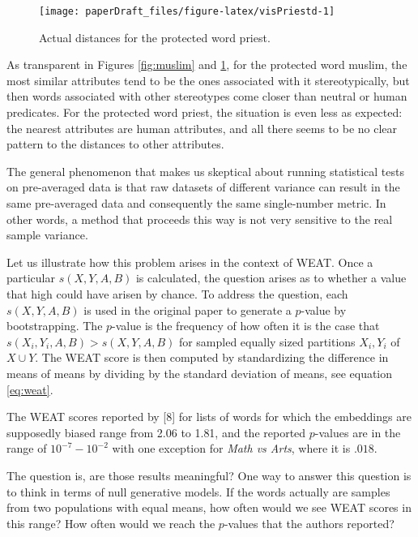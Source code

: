 \documentclass[
  12pt,
  dvipsnames,enabledeprecatedfontcommands]{scrartcl}
\begin{document}
\begin{figure}[H]

\begin{center}\texttt{[image: paperDraft\_files/figure-latex/visPriestd-1]} \end{center}

\caption{Actual distances for the protected word \textsf{priest}.}
\label{fig:priest}
\end{figure}

As transparent in Figures \ref{fig:muslim} and \ref{fig:priest}, for the
protected word \textsf{muslim}, the most similar attributes tend to be
the ones associated with it stereotypically, but then words associated
with other stereotypes come closer than neutral or human predicates. For
the protected word \textsf{priest}, the situation is even less as
expected: the nearest attributes are human attributes, and all there
seems to be no clear pattern to the distances to other attributes.

The general phenomenon that makes us skeptical about running statistical
tests on pre-averaged data is that raw datasets of different variance
can result in the same pre-averaged data and consequently the same
single-number metric. In other words, a method that proceeds this way is
not very sensitive to the real sample variance.

Let us illustrate how this problem arises in the context of
\textsf{WEAT}. Once a particular \(s(X,Y,A,B)\) is calculated, the
question arises as to whether a value that high could have arisen by
chance. To address the question, each \(s(X,Y,A,B)\) is used in the
original paper to generate a \(p\)-value by bootstrapping. The
\(p\)-value is the frequency of how often it is the case that
\(s(X_i,Y_i,A,B)>s(X,Y,A,B)\) for sampled equally sized partitions
\(X_i, Y_i\) of \(X\cup Y\). The WEAT score is then computed by
standardizing the difference in means of means by dividing by the
standard deviation of means, see equation \eqref{eq:weat}.

\normalsize

\noindent The \textsf{WEAT} scores reported by {[}8{]} for lists of
words for which the embeddings are supposedly biased range from 2.06 to
1.81, and the reported \(p\)-values are in the range of
\(10^{-7}-10^{-2}\) with one exception for \emph{Math vs Arts}, where it
is \(.018\).

The question is, are those results meaningful? One way to answer this
question is to think in terms of null generative models. If the words
actually are samples from two populations with equal means, how often
would we see \textsf{WEAT} scores in this range? How often would we
reach the \(p\)-values that the authors reported?
\end{document}
